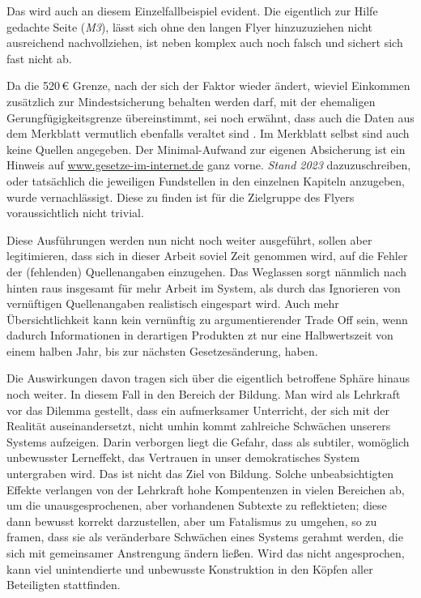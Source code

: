 Das wird auch an diesem Einzelfallbeispiel evident. Die eigentlich zur Hilfe gedachte Seite (\emph{M3}), lässt sich ohne den langen Flyer hinzuzuziehen nicht ausreichend nachvollziehen, ist neben komplex auch noch falsch und sichert sich fast nicht ab. 

Da die 520\,€ Grenze, nach der sich der Faktor wieder ändert, wieviel Einkommen zusätzlich zur Mindestsicherung behalten werden darf, mit der ehemaligen Gerungfügigkeitsgrenze übereinstimmt, sei noch erwähnt, dass auch die Daten aus dem Merkblatt vermutlich ebenfalls veraltet sind \autocite[59-62]{MerkblattSGBII}. Im Merkblatt selbst sind auch keine Quellen angegeben. Der Minimal-Aufwand zur eigenen Absicherung ist ein Hinweis auf \url{www.gesetze-im-internet.de} ganz vorne. \emph{Stand 2023} dazuzuschreiben, oder tatsächlich die jeweiligen Fundstellen in den einzelnen Kapiteln anzugeben, wurde vernachlässigt. Diese zu finden ist für die Zielgruppe des Flyers voraussichtlich nicht trivial. 

Diese Ausführungen werden nun nicht noch weiter ausgeführt, sollen aber legitimieren, dass sich in dieser Arbeit soviel Zeit genommen wird, auf die Fehler der (fehlenden) Quellenangaben einzugehen. Das Weglassen sorgt nänmlich nach hinten raus insgesamt für mehr Arbeit im System, als durch das Ignorieren von vernüftigen Quellenangaben realistisch eingespart wird. Auch mehr Übersichtlichkeit kann kein vernünftig zu argumentierender Trade Off sein, wenn dadurch Informationen in derartigen Produkten \gls{zt} nur eine Halbwertszeit von einem halben Jahr, bis zur nächsten Gesetzesänderung, haben.
\bigskip

Die Auswirkungen davon tragen sich über die eigentlich betroffene Sphäre hinaus noch weiter. In diesem Fall in den Bereich der Bildung. Man wird als Lehrkraft vor das Dilemma gestellt, dass ein aufmerksamer Unterricht, der sich mit der Realität auseinandersetzt, nicht umhin kommt zahlreiche Schwächen unserers Systems aufzeigen. Darin verborgen liegt die Gefahr, dass als subtiler, womöglich unbewusster Lerneffekt, das Vertrauen in unser demokratisches System untergraben wird. Das ist nicht das Ziel von Bildung. 
Solche unbeabsichtigten Effekte verlangen von der Lehrkraft hohe Kompentenzen in vielen Bereichen ab, um die unausgesprochenen, aber vorhandenen Subtexte zu reflektieten; diese dann bewusst korrekt darzustellen, aber um Fatalismus zu umgehen, so zu framen, dass sie als veränderbare Schwächen eines Systems gerahmt werden, die sich mit gemeinsamer Anstrengung ändern ließen. Wird das nicht angesprochen, kann viel unintendierte und unbewusste Konstruktion in den Köpfen aller Beteiligten stattfinden. 
\bigskip


